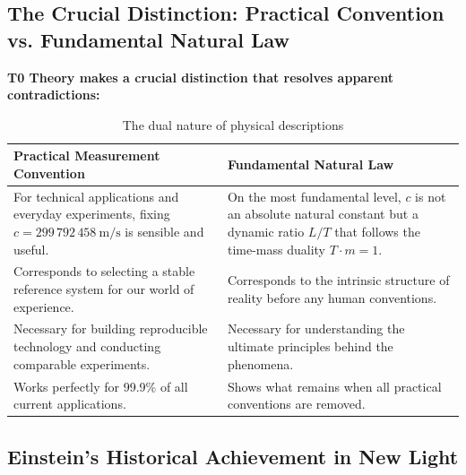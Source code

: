 	\subsection{The Crucial Distinction: Practical Convention vs. Fundamental Natural Law}
	
	\textbf{T0 Theory makes a crucial distinction that resolves apparent contradictions:}
	
	\begin{table}[H]
		\centering
		\begin{tabular}{|p{6cm}|p{6cm}|}
			\hline
			\textbf{Practical Measurement Convention} & \textbf{Fundamental Natural Law} \\
			\hline
			For technical applications and everyday experiments, fixing \( c = 299\,792\,458 \ \text{m/s} \) is sensible and useful. & On the most fundamental level, \( c \) is not an absolute natural constant but a dynamic ratio \( L/T \) that follows the time-mass duality \( T \cdot m = 1 \). \\
			\hline
			Corresponds to selecting a stable reference system for our world of experience. & Corresponds to the intrinsic structure of reality before any human conventions. \\
			\hline
			Necessary for building reproducible technology and conducting comparable experiments. & Necessary for understanding the ultimate principles behind the phenomena. \\
			\hline
			Works perfectly for 99.9\% of all current applications. & Shows what remains when all practical conventions are removed. \\
			\hline
		\end{tabular}
		\caption{The dual nature of physical descriptions}
	\end{table}
	
	\subsection{Einstein's Historical Achievement in New Light}
	
